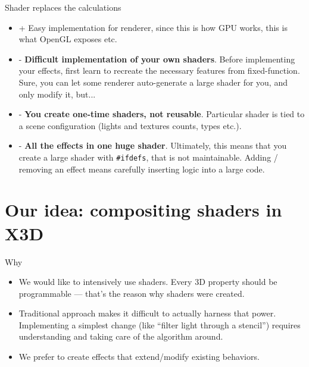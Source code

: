 \documentclass{beamer}
\begin{document}
\begin{frame}{Shader replaces the calculations}

\begin{itemize}
  \item + Easy implementation for renderer, since this is how GPU works,
    this is what OpenGL exposes etc.
  \item - \textbf{Difficult implementation of your own shaders}.
    Before implementing your effects, first learn to recreate
    the necessary features from fixed-function.
    Sure, you can let some renderer auto-generate a large shader for you,
    and only modify it, but...
  \item - \textbf{You create one-time shaders, not reusable}.
    Particular shader is tied to a scene configuration (lights and textures
    counts, types etc.).
  \item - \textbf{All the effects in one huge shader}.
    Ultimately, this means that you create a large shader with \texttt{\#ifdefs},
    that is not maintainable. Adding / removing an effect means carefully
    inserting logic into a large code.
\end{itemize}
\end{frame}

\section[Our idea]{Our idea: compositing shaders in X3D}

\begin{frame}{Why}
\begin{itemize}
  \item We would like to intensively use shaders. Every 3D property
    should be programmable --- that's the reason why shaders were created.

  \item Traditional approach
    makes it difficult to actually harness that power.
    Implementing a simplest change (like ``filter light through a stencil'')
    requires understanding and taking care of the algorithm around.

  \item We prefer to create effects that extend/modify existing behaviors.
\end{itemize}
\end{frame}
\end{document}
